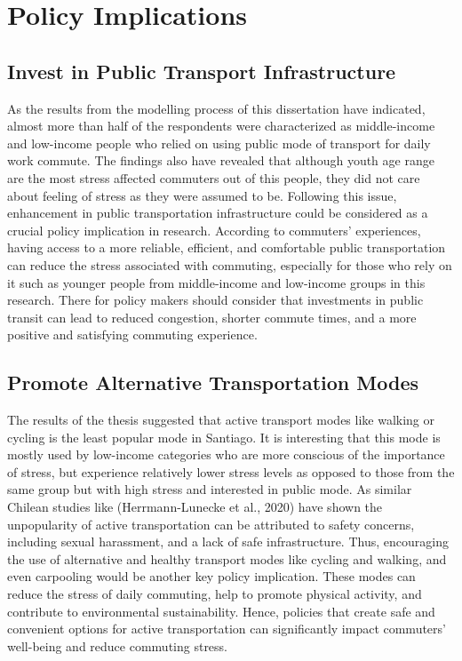 \documentclass[
11pt, %
oneside, %
english, %
singlespacing, %
]{macthesis} %
\begin{document}
\hypertarget{policy-implications}{%
\section{Policy Implications}\label{policy-implications}}

\hypertarget{invest-in-public-transport-infrastructure}{%
\subsection{Invest in Public Transport Infrastructure}\label{invest-in-public-transport-infrastructure}}

As the results from the modelling process of this dissertation have indicated, almost more than half of the respondents were characterized as middle-income and low-income people who relied on using public mode of transport for daily work commute. The findings also have revealed that although youth age range are the most stress affected commuters out of this people, they did not care about feeling of stress as they were assumed to be. Following this issue, enhancement in public transportation infrastructure could be considered as a crucial policy implication in research. According to commuters' experiences, having access to a more reliable, efficient, and comfortable public transportation can reduce the stress associated with commuting, especially for those who rely on it such as younger people from middle-income and low-income groups in this research. There for policy makers should consider that investments in public transit can lead to reduced congestion, shorter commute times, and a more positive and satisfying commuting experience.

\hypertarget{promote-alternative-transportation-modes}{%
\subsection{Promote Alternative Transportation Modes}\label{promote-alternative-transportation-modes}}

The results of the thesis suggested that active transport modes like walking or cycling is the least popular mode in Santiago. It is interesting that this mode is mostly used by low-income categories who are more conscious of the importance of stress, but experience relatively lower stress levels as opposed to those from the same group but with high stress and interested in public mode. As similar Chilean studies like (Herrmann-Lunecke et al., 2020) have shown the unpopularity of active transportation can be attributed to safety concerns, including sexual harassment, and a lack of safe infrastructure. Thus, encouraging the use of alternative and healthy transport modes like cycling and walking, and even carpooling would be another key policy implication. These modes can reduce the stress of daily commuting, help to promote physical activity, and contribute to environmental sustainability. Hence, policies that create safe and convenient options for active transportation can significantly impact commuters' well-being and reduce commuting stress.
\end{document}
